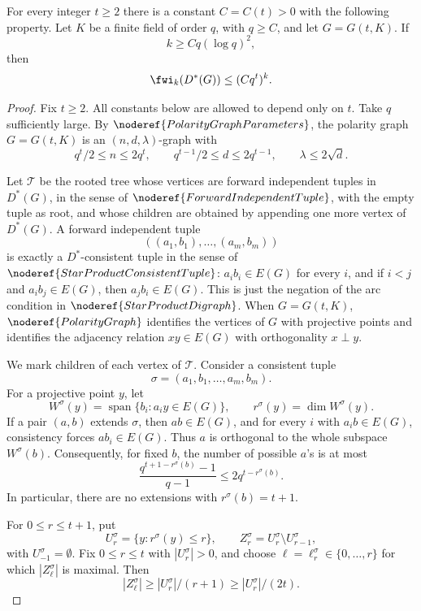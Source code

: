 \begin{lemma}
For every integer \(t\ge2\) there is a constant \(C=C(t)>0\) with the
following property.  Let \(K\) be a finite field of order \(q\), with
\(q\ge C\), and let \(G=G(t,K)\).  If
\[
  k\ge Cq(\log q)^2,
\]
then
\[
  \fwi_k(D^*(G))\le (Cq^t)^k.
\]
\end{lemma}
\begin{proof}
Fix \(t\ge2\).  All constants below are allowed to depend only on \(t\).
Take \(q\) sufficiently large.  By \(\noderef{PolarityGraphParameters}\), the
polarity graph \(G=G(t,K)\) is an \((n,d,\lambda)\)-graph with
\[
  q^t/2\le n\le2q^t,\qquad
  q^{t-1}/2\le d\le2q^{t-1},\qquad
  \lambda\le2\sqrt d. \tag{1}
\]

Let \(\mathcal T\) be the rooted tree whose vertices are forward independent
tuples in \(D^*(G)\), in the sense of \(\noderef{ForwardIndependentTuple}\),
with the empty tuple as root, and whose children are obtained by appending one
more vertex of \(D^*(G)\).  A forward independent tuple
\[
  ((a_1,b_1),\ldots,(a_m,b_m))
\]
is exactly a \(D^*\)-consistent tuple in the sense of
\(\noderef{StarProductConsistentTuple}\): \(a_i b_i\in E(G)\) for every \(i\),
and if \(i<j\) and \(a_i b_j\in E(G)\), then \(a_j b_i\in E(G)\).  This is
just the negation of the arc condition in \(\noderef{StarProductDigraph}\).
When \(G=G(t,K)\), \(\noderef{PolarityGraph}\) identifies the vertices of
\(G\) with projective points and identifies the adjacency relation
\(xy\in E(G)\) with orthogonality \(x\perp y\).

We mark children of each vertex of \(\mathcal T\).  Consider a consistent
tuple
\[
  \sigma=(a_1,b_1,\ldots,a_m,b_m).
\]
For a projective point \(y\), let
\[
  W^\sigma(y)=\operatorname{span}\{b_i:a_i y\in E(G)\},
  \qquad
  r^\sigma(y)=\dim W^\sigma(y).
\]
If a pair \((a,b)\) extends \(\sigma\), then \(ab\in E(G)\), and for every
\(i\) with \(a_i b\in E(G)\), consistency forces \(a b_i\in E(G)\).  Thus
\(a\) is orthogonal to the whole subspace \(W^\sigma(b)\).  Consequently, for
fixed \(b\), the number of possible \(a\)'s is at most
\[
  \frac{q^{t+1-r^\sigma(b)}-1}{q-1}\le 2q^{t-r^\sigma(b)}. \tag{2}
\]
In particular, there are no extensions with \(r^\sigma(b)=t+1\).

For \(0\le r\le t+1\), put
\[
  U_r^\sigma=\{y:r^\sigma(y)\le r\},\qquad
  Z_r^\sigma=U_r^\sigma\setminus U_{r-1}^\sigma,
\]
with \(U_{-1}^\sigma=\emptyset\).  Fix \(0\le r\le t\) with
\(|U_r^\sigma|>0\), and choose \(\ell=\ell_r^\sigma\in\{0,\ldots,r\}\) for
which \(|Z_\ell^\sigma|\) is maximal.  Then
\[
  |Z_\ell^\sigma|\ge |U_r^\sigma|/(r+1)\ge |U_r^\sigma|/(2t). \tag{3}
\]


\end{proof}
